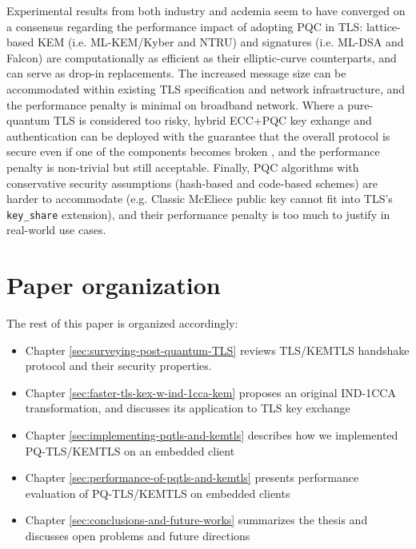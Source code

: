 \documentclass[letterpaper,12pt,titlepage,oneside,final]{book}
\begin{document}
Experimental results from both industry and acdemia seem to have converged on a consensus regarding the performance impact of adopting PQC in TLS:
lattice-based KEM (i.e. ML-KEM/Kyber and NTRU) and signatures (i.e. ML-DSA and Falcon) are computationally as efficient as their elliptic-curve counterparts, and can serve as drop-in replacements.
The increased message size can be accommodated within existing TLS specification and network infrastructure, and the performance penalty is minimal on broadband network.
Where a pure-quantum TLS is considered too risky, hybrid ECC+PQC key exhange and authentication can be deployed with the guarantee that the overall protocol is secure even if one of the components becomes broken \cite{DBLP:conf/camad/GarciaAOMR23,DBLP:journals/iacr/BarbosaCDKSVW24,DBLP:conf/dsd/MarchsreiterS22,DBLP:journals/iacr/CrockettPS19}, and the performance penalty is non-trivial but still acceptable.
Finally, PQC algorithms with conservative security assumptions (hash-based and code-based schemes) are harder to accommodate (e.g. Classic McEliece public key cannot fit into TLS's \texttt{key\_share} extension), and their performance penalty is too much to justify in real-world use cases.

\section{Paper organization}
The rest of this paper is organized accordingly: \begin{itemize}
    \item Chapter \ref{sec:surveying-post-quantum-TLS} reviews TLS/KEMTLS handshake protocol and their security properties.
    \item Chapter \ref{sec:faster-tls-kex-w-ind-1cca-kem} proposes an original IND-1CCA transformation, and discusses its application to TLS key exchange
    \item Chapter \ref{sec:implementing-pqtls-and-kemtls} describes how we implemented PQ-TLS/KEMTLS on an embedded client
    \item Chapter \ref{sec:performance-of-pqtls-and-kemtls} presents performance evaluation of PQ-TLS/KEMTLS on embedded clients
    \item Chapter \ref{sec:conclusions-and-future-works} summarizes the thesis and discusses open problems and future directions
\end{itemize}
\end{document}
